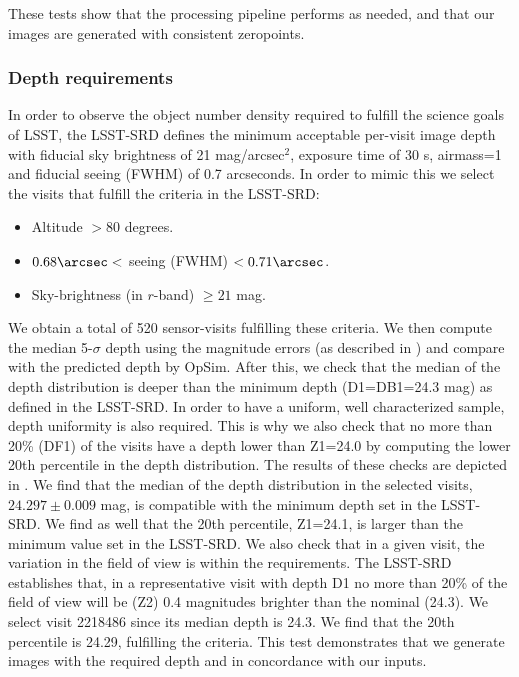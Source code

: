 \documentclass[\docopts]{\docclass}
\begin{document}
These tests show that the processing pipeline performs as needed, and that our images are generated with consistent zeropoints.

\subsubsection{Depth requirements}
\label{sssec:depth}
In order to observe the object number density required to fulfill the science goals of LSST, the LSST-SRD defines the minimum acceptable per-visit image depth with fiducial sky brightness of 21 mag/arcsec$^2$, exposure time of 30 s, airmass=1 and fiducial seeing (FWHM) of 0.7 arcseconds. In order to mimic this we select the visits that fulfill the criteria in the LSST-SRD:
\begin{itemize}
\item Altitude $> 80$ degrees.
\item $0.68\arcsec <$ seeing (FWHM) $ < 0.71\arcsec$.
\item Sky-brightness (in $r$-band) $ \geq 21$ mag. 
\end{itemize}
We obtain a total of 520 sensor-visits fulfilling these criteria. We then compute the median 5-$\sigma$ depth  using the magnitude errors (as described in ) and compare with the predicted depth by OpSim. After this, we check that the median of the depth distribution is deeper than the minimum depth (D1=DB1=24.3 mag) as defined in the LSST-SRD. In order to have a uniform, well characterized sample, depth uniformity is also required. This is why we also check that no more than 20\% (DF1) of the visits have a depth lower than Z1=24.0 by computing the lower 20th percentile in the depth distribution. The results of these checks are depicted in . We find that the median of the depth distribution in the selected visits, $24.297 \pm 0.009$ mag, is compatible with the minimum depth set in the LSST-SRD. We find as well that the 20th percentile, Z1=24.1, is larger than the minimum value set in the LSST-SRD. We also check that in a given visit, the variation in the field of view is within the requirements. The LSST-SRD establishes that, in a representative visit with depth D1 no more than 20\% of the field of view will be (Z2) 0.4 magnitudes brighter than the nominal (24.3). We select visit 2218486 since its median depth is 24.3. We find that the 20th percentile is 24.29, fulfilling the criteria. This test demonstrates that we generate images with the required depth and in concordance with our inputs.
\end{document}
